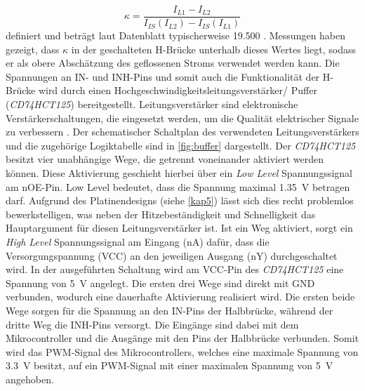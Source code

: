 \begin{equation}
\kappa = \frac{I_{L1}-I_{L2}}{I_{IS}(I_{L2})-I_{IS}(I_{L1})}
\end{equation}\noindent
definiert und beträgt laut Datenblatt typischerweise 19.500 \cite[S.20]{btn}. Messungen haben gezeigt, dass $\kappa$ in der geschalteten H-Brücke unterhalb dieses Wertes liegt, sodass er als obere Abschätzung des geflossenen Stroms verwendet werden kann.
Die Spannungen an IN- und INH-Pins und somit auch die Funktionalität der H-Brücke wird durch einen Hochgeschwindigkeitsleitungsverstärker/ Puffer (\textit{CD74HCT125}) bereitgestellt. Leitungsverstärker sind elektronische Verstärkerschaltungen, die eingesetzt werden, um die Qualität elektrischer Signale zu verbessern \cite{Conrads2014}. Der schematischer Schaltplan des verwendeten Leitungsverstärkers und die zugehörige Logiktabelle sind in \autoref{fig:buffer} dargestellt. Der \textit{CD74HCT125} besitzt vier unabhängige Wege, die getrennt voneinander aktiviert werden können. Diese Aktivierung geschieht hierbei über ein \textit{Low Level} Spannungssignal am nOE-Pin. Low Level bedeutet, dass die Spannung maximal \SI{1,35}{V} betragen darf. Aufgrund des Platinendesigns (siehe \autoref{kap5}) lässt sich dies recht problemlos bewerkstelligen, was neben der Hitzebeständigkeit und Schnelligkeit das Hauptargument für diesen Leitungsverstärker ist. Ist ein Weg aktiviert, sorgt ein \textit{High Level} Spannungssignal am Eingang (nA) dafür, dass die Versorgungspannung (VCC) an den jeweiligen Ausgang (nY) durchgeschaltet wird. In der ausgeführten Schaltung wird am VCC-Pin des \textit{CD74HCT125} eine Spannung von \SI{5}{V} angelegt. Die ersten drei Wege sind direkt mit GND verbunden, wodurch eine dauerhafte Aktivierung realisiert wird. Die ersten beide Wege sorgen für die Spannung an den IN-Pins der Halbbrücke, während der dritte Weg die INH-Pins versorgt. Die Eingänge sind dabei mit dem Mikrocontroller und die Ausgänge mit den Pins der Halbbrücke verbunden. Somit wird das PWM-Signal des Mikrocontrollers, welches eine maximale Spannung von \SI{3,3}{V} besitzt, auf ein PWM-Signal mit einer maximalen Spannung von \SI{5}{V} angehoben.

